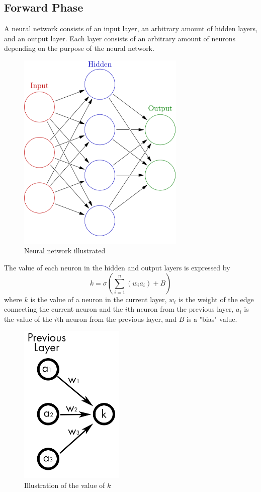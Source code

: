 \documentclass[a4paper, 11pt, english]{article}
\begin{document}
\subsection{Forward Phase}
\par A neural network consists of an input layer, an arbitrary amount of hidden layers, and an output layer. Each layer consists of an arbitrary amount of neurons depending on the purpose of the neural network.

\begin{figure}[H]
  \centering
  \includegraphics[width=8cm]{images/nn1.png}
  \caption{Neural network illustrated} %
  \label{fig:nn1}
\end{figure}

\par The value of each neuron in the hidden and output layers is expressed by
\[k = \sigma(\sum_{i=1}^{n}(w_ia_i) + B)\]
where $k$ is the value of a neuron in the current layer, $w_i$ is the weight of the edge connecting the current neuron and the $i$th neuron from the previous layer, $a_i$ is the value of the $i$th neuron from the previous layer, and $B$ is a "bias" value.

\begin{figure}[H]
  \centering
  \includegraphics[width=5cm]{images/nn2.png}
  \caption{Illustration of the value of $k$} %
  \label{fig:nn2}
\end{figure}
\end{document}
